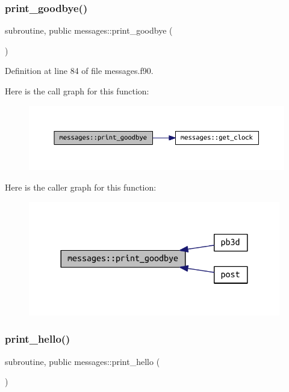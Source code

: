 \subsubsection{\texorpdfstring{print\+\_\+goodbye()}{print\_goodbye()}}
{\footnotesize\ttfamily subroutine, public messages\+::print\+\_\+goodbye (\begin{DoxyParamCaption}{ }\end{DoxyParamCaption})}



Definition at line 84 of file messages.\+f90.

Here is the call graph for this function\+:
\nopagebreak
\begin{figure}[H]
\begin{center}
\leavevmode
\includegraphics[width=350pt]{namespacemessages_a0b3d8398d726bbf90e0c6df9f2df2c88_cgraph}
\end{center}
\end{figure}
Here is the caller graph for this function\+:
\nopagebreak
\begin{figure}[H]
\begin{center}
\leavevmode
\includegraphics[width=312pt]{namespacemessages_a0b3d8398d726bbf90e0c6df9f2df2c88_icgraph}
\end{center}
\end{figure}
\mbox{\label{namespacemessages_afb11646c8cb3655bdfc2f9c039851c0c}} 
\subsubsection{\texorpdfstring{print\+\_\+hello()}{print\_hello()}}
{\footnotesize\ttfamily subroutine, public messages\+::print\+\_\+hello (\begin{DoxyParamCaption}{ }\end{DoxyParamCaption})}



